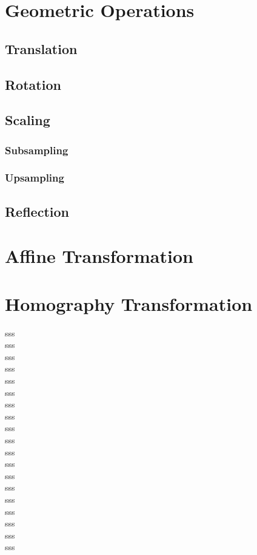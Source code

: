 \section{Geometric Operations}
\subsection{Translation}
\subsection{Rotation}
\subsection{Scaling}
\subsubsection{Subsampling}
\subsubsection{Upsampling}
\subsection{Reflection}
\section{Affine Transformation}
\section{Homography Transformation}
sss\\
sss\\
sss\\
sss\\
sss\\
sss\\
sss\\
sss\\
sss\\
sss\\
sss\\
sss\\
sss\\
sss\\
sss\\
sss\\
sss\\
sss\\
sss\\
